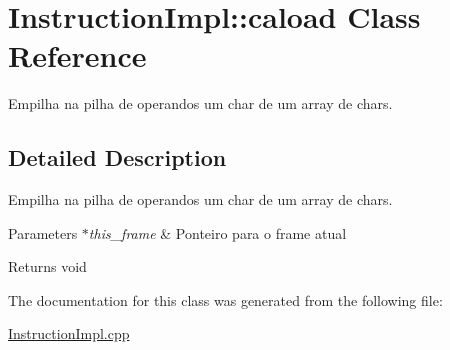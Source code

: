 \hypertarget{class_instruction_impl_1_1caload}{}\section{Instruction\+Impl\+:\+:caload Class Reference}
\label{class_instruction_impl_1_1caload}


Empilha na pilha de operandos um char de um array de chars.  




\subsection{Detailed Description}
Empilha na pilha de operandos um char de um array de chars. 


\begin{DoxyParams}{Parameters}
{\em $\ast$this\+\_\+frame} & Ponteiro para o frame atual \\
\hline
\end{DoxyParams}
\begin{DoxyReturn}{Returns}
void 
\end{DoxyReturn}


The documentation for this class was generated from the following file\+:\begin{DoxyCompactItemize}
\item 
\hyperlink{_instruction_impl_8cpp}{Instruction\+Impl.\+cpp}\end{DoxyCompactItemize}
